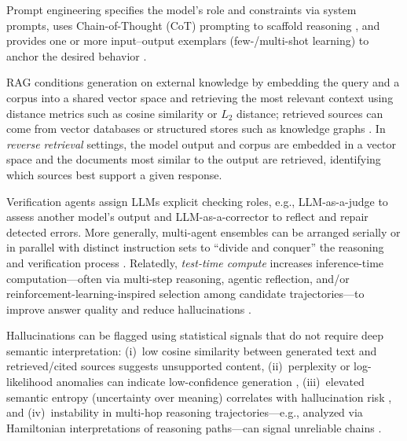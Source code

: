 \begin{description}[style=unboxed,leftmargin=1em,labelindent=0pt]
    \item[Prompt-based.] Prompt engineering specifies the model's role and constraints via system prompts, uses Chain-of-Thought (CoT) prompting to scaffold reasoning \citep{wei2022chain}, and provides one or more input--output exemplars (few-/multi-shot learning) to anchor the desired behavior \citep{brown2020language}.

    \item[Retrieval-Augmented Generation.] RAG conditions generation on external knowledge by embedding the query and a corpus into a shared vector space and retrieving the most relevant context using distance metrics such as cosine similarity or $L_2$ distance; retrieved sources can come from vector databases or structured stores such as knowledge graphs \citep{lewis2020retrieval}. In \emph{reverse retrieval} settings, the model output and corpus are embedded in a vector space and the documents most similar to the output are retrieved, identifying which sources best support a given response.

    \item[System orchestration.] Verification agents assign LLMs explicit checking roles, e.g., LLM-as-a-judge to assess another model's output and LLM-as-a-corrector to reflect and repair detected errors. More generally, multi-agent ensembles can be arranged serially or in parallel with distinct instruction sets to ``divide and conquer'' the reasoning and verification process \citep{shinn2024reflexion}. Relatedly, \emph{test-time compute} increases inference-time computation---often via multi-step reasoning, agentic reflection, and/or reinforcement-learning-inspired selection among candidate trajectories---to improve answer quality and reduce hallucinations \citep{openai2024reasoning, guo2025deepseek}.

    \item[Context-insensitive metrics.] Hallucinations can be flagged using statistical signals that do not require deep semantic interpretation: (i)~low cosine similarity between generated text and retrieved/cited sources suggests unsupported content, (ii)~perplexity or log-likelihood anomalies can indicate low-confidence generation \citep{varshney2023stitch}, (iii)~elevated semantic entropy (uncertainty over meaning) correlates with hallucination risk \citep{farquhar2024detecting}, and (iv)~instability in multi-hop reasoning trajectories---e.g., analyzed via Hamiltonian interpretations of reasoning paths---can signal unreliable chains \citep{marin2024optimizing}.
\end{description}

